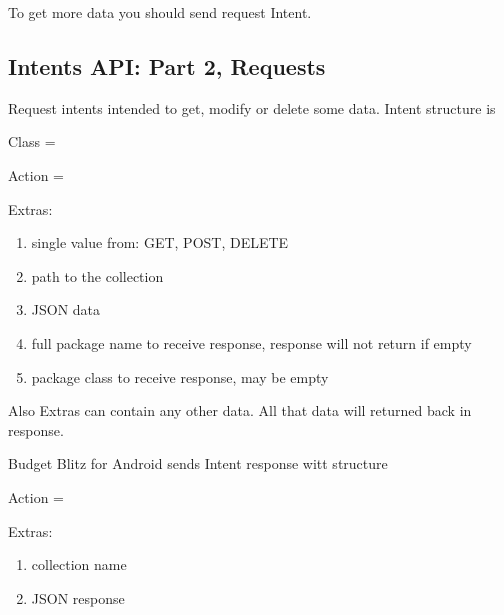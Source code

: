 \documentclass[a4paper,10pt,english]{sphinxmanual}
\begin{document}
\sphinxAtStartPar
To get more data you should send request Intent.


\subsection{Intents API: Part 2, Requests}
\label{\detokenize{api:intents-api-part-2-requests}}
\sphinxAtStartPar
Request intents intended to get, modify or delete some data. Intent structure is

\sphinxAtStartPar
Class = 

\sphinxAtStartPar
Action = 

\sphinxAtStartPar
Extras:
\begin{enumerate}
%
\item {} 
\sphinxAtStartPar
{} \sphinxhyphen{} single value from: GET, POST, DELETE

\item {} 
\sphinxAtStartPar
{} \sphinxhyphen{} path to the collection

\item {} 
\sphinxAtStartPar
{} \sphinxhyphen{} JSON data

\item {} 
\sphinxAtStartPar
{} \sphinxhyphen{} full package name to receive response, response will not return if empty

\item {} 
\sphinxAtStartPar
{} \sphinxhyphen{} package class to receive response, may be empty

\end{enumerate}

\sphinxAtStartPar
Also Extras can contain any other data. All that data will returned back in response.

\sphinxAtStartPar
Budget Blitz for Android sends Intent response witt structure

\sphinxAtStartPar
Action = 

\sphinxAtStartPar
Extras:
\begin{enumerate}
%
\item {} 
\sphinxAtStartPar
{} \sphinxhyphen{} collection name

\item {} 
\sphinxAtStartPar
{} \sphinxhyphen{} JSON response

\end{enumerate}
\end{document}
